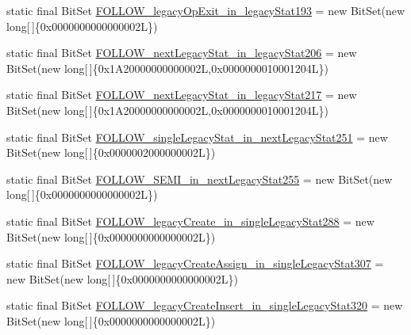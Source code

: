\begin{DoxyCompactItemize}
\item 
static final Bit\-Set \hyperlink{classorg_1_1tzi_1_1use_1_1parser_1_1shell_1_1_shell_command_parser_a708439c7a164351326cc684552cf2179}{F\-O\-L\-L\-O\-W\-\_\-legacy\-Op\-Exit\-\_\-in\-\_\-legacy\-Stat193} = new Bit\-Set(new long\mbox{[}$\,$\mbox{]}\{0x0000000000000002\-L\})
\item 
static final Bit\-Set \hyperlink{classorg_1_1tzi_1_1use_1_1parser_1_1shell_1_1_shell_command_parser_a35305216aa8099db55161f13022d05b6}{F\-O\-L\-L\-O\-W\-\_\-next\-Legacy\-Stat\-\_\-in\-\_\-legacy\-Stat206} = new Bit\-Set(new long\mbox{[}$\,$\mbox{]}\{0x1\-A20000000000002\-L,0x0000000010001204\-L\})
\item 
static final Bit\-Set \hyperlink{classorg_1_1tzi_1_1use_1_1parser_1_1shell_1_1_shell_command_parser_abe28b0eefa4b6727fdab64a139dc566d}{F\-O\-L\-L\-O\-W\-\_\-next\-Legacy\-Stat\-\_\-in\-\_\-legacy\-Stat217} = new Bit\-Set(new long\mbox{[}$\,$\mbox{]}\{0x1\-A20000000000002\-L,0x0000000010001204\-L\})
\item 
static final Bit\-Set \hyperlink{classorg_1_1tzi_1_1use_1_1parser_1_1shell_1_1_shell_command_parser_a4c0d1e1b3c4adf9f258bde7bd71c5970}{F\-O\-L\-L\-O\-W\-\_\-single\-Legacy\-Stat\-\_\-in\-\_\-next\-Legacy\-Stat251} = new Bit\-Set(new long\mbox{[}$\,$\mbox{]}\{0x0000002000000002\-L\})
\item 
static final Bit\-Set \hyperlink{classorg_1_1tzi_1_1use_1_1parser_1_1shell_1_1_shell_command_parser_a913665aa01b7b5999d080e2ad6564039}{F\-O\-L\-L\-O\-W\-\_\-\-S\-E\-M\-I\-\_\-in\-\_\-next\-Legacy\-Stat255} = new Bit\-Set(new long\mbox{[}$\,$\mbox{]}\{0x0000000000000002\-L\})
\item 
static final Bit\-Set \hyperlink{classorg_1_1tzi_1_1use_1_1parser_1_1shell_1_1_shell_command_parser_a155f46340e495c10f320cba1279fb166}{F\-O\-L\-L\-O\-W\-\_\-legacy\-Create\-\_\-in\-\_\-single\-Legacy\-Stat288} = new Bit\-Set(new long\mbox{[}$\,$\mbox{]}\{0x0000000000000002\-L\})
\item 
static final Bit\-Set \hyperlink{classorg_1_1tzi_1_1use_1_1parser_1_1shell_1_1_shell_command_parser_a024af53a2765080850a6876ecea6d4db}{F\-O\-L\-L\-O\-W\-\_\-legacy\-Create\-Assign\-\_\-in\-\_\-single\-Legacy\-Stat307} = new Bit\-Set(new long\mbox{[}$\,$\mbox{]}\{0x0000000000000002\-L\})
\item 
static final Bit\-Set \hyperlink{classorg_1_1tzi_1_1use_1_1parser_1_1shell_1_1_shell_command_parser_a2bc136b087efc23bb0673445ac277138}{F\-O\-L\-L\-O\-W\-\_\-legacy\-Create\-Insert\-\_\-in\-\_\-single\-Legacy\-Stat320} = new Bit\-Set(new long\mbox{[}$\,$\mbox{]}\{0x0000000000000002\-L\})

\end{DoxyCompactItemize}
